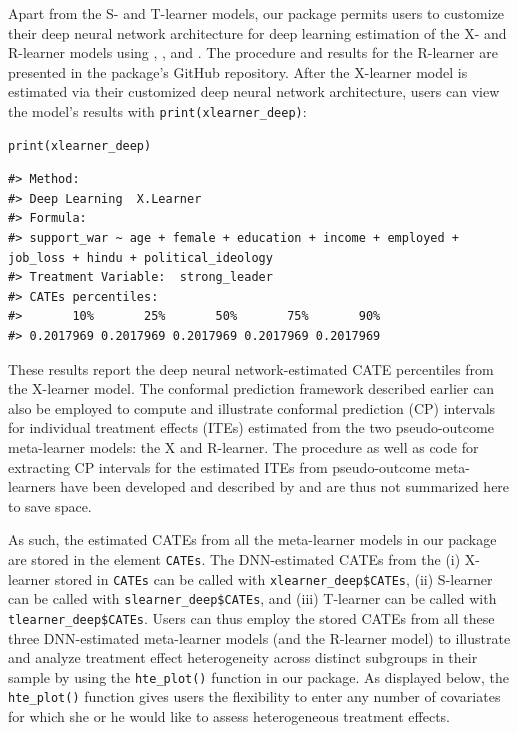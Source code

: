Apart from the S- and T-learner models, our package permits users to
customize their deep neural network architecture for deep learning
estimation of the X- and R-learner models using ,
, and . The procedure and results for the
R-learner are presented in the package's GitHub repository. After the
X-learner model is estimated via their customized deep neural network
architecture, users can view the model's results with
\texttt{print(xlearner\_deep)}:

\begin{verbatim}
print(xlearner_deep)
\end{verbatim}

\begin{verbatim}
#> Method:
#> Deep Learning  X.Learner
#> Formula:
#> support_war ~ age + female + education + income + employed +      job_loss + hindu + political_ideology
#> Treatment Variable:  strong_leader
#> CATEs percentiles:
#>       10%       25%       50%       75%       90% 
#> 0.2017969 0.2017969 0.2017969 0.2017969 0.2017969
\end{verbatim}

These results report the deep neural network-estimated CATE percentiles
from the X-learner model. The conformal prediction framework described
earlier can also be employed to compute and illustrate conformal
prediction (CP) intervals for individual treatment effects (ITEs)
estimated from the two pseudo-outcome meta-learner models: the X and
R-learner. The procedure as well as code for extracting CP intervals for
the estimated ITEs from pseudo-outcome meta-learners have been developed
and described by \citet{Alaa2023conformal} and are thus not summarized here to
save space.

As such, the estimated CATEs from all the meta-learner models in our
package are stored in the element \texttt{CATEs}. The DNN-estimated CATEs from
the (i) X-learner stored in \texttt{CATEs} can be called with
\texttt{xlearner\_deep\$CATEs}, (ii) S-learner can be called with
\texttt{slearner\_deep\$CATEs}, and (iii) T-learner can be called with
\texttt{tlearner\_deep\$CATEs}. Users can thus employ the stored CATEs from all
these three DNN-estimated meta-learner models (and the R-learner model)
to illustrate and analyze treatment effect heterogeneity across distinct
subgroups in their sample by using the \texttt{hte\_plot()} function in our
package. As displayed below, the \texttt{hte\_plot()} function gives users the
flexibility to enter any number of covariates for which she or he would
like to assess heterogeneous treatment effects.

